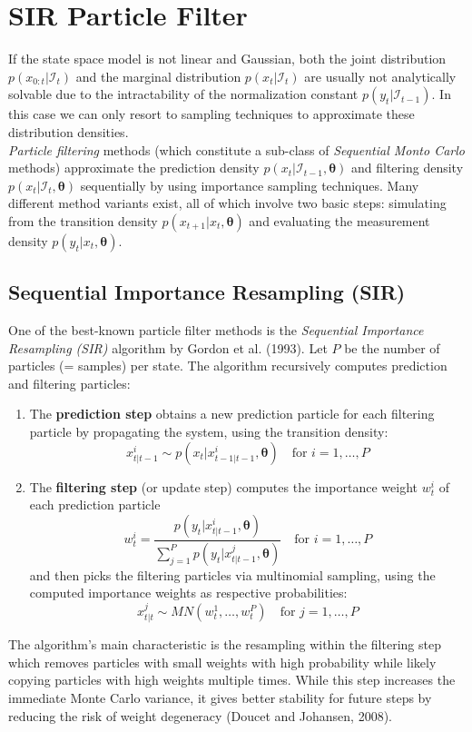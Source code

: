 \documentclass[11pt, oneside]{scrreprt}   	%
\begin{document}
\section{SIR Particle Filter}
If the state space model is not linear and Gaussian, both the joint distribution $p(x_{0:t} | \mathcal{I}_t)$ and the marginal distribution $p(x_{t} | \mathcal{I}_t)$ are usually not analytically solvable due to the intractability of the normalization constant $p(y_t | \mathcal{I}_{t-1})$. In this case we can only resort to sampling techniques to approximate these distribution densities. \\

\textit{Particle filtering} methods (which constitute a sub-class of \textit{Sequential Monto Carlo} methods) approximate the prediction density $p(x_{t} | \mathcal{I}_{t-1}, \boldsymbol{\theta})$ and filtering density $p(x_{t} | \mathcal{I}_{t}, \boldsymbol{\theta})$ sequentially by using importance sampling techniques. Many different method variants exist, all of which involve two basic steps: simulating from the transition density $p(x_{t+1} | x_t, \boldsymbol{\theta})$ and evaluating the measurement density $p(y_t | x_t, \boldsymbol{\theta})$. 

\subsection{Sequential Importance Resampling (SIR)}
One of the best-known particle filter methods is the \textit{Sequential Importance Resampling (SIR)} algorithm by Gordon et al. (1993). Let $P$ be the number of particles (= samples) per state. The algorithm recursively computes prediction and filtering particles:
\begin{enumerate}
	\item The \textbf{prediction step} obtains a new prediction particle for each filtering particle by propagating the system, using the transition density:
	$$
	x_{t | t-1}^i \sim p(x_t | x_{t-1 | t-1}^i, \boldsymbol{\theta}) \quad \text{for } i=1, \ldots, P
	$$
	\item The \textbf{filtering step} (or update step) computes the importance weight $w_t^i$ of each prediction particle 
	$$
	w_{t}^i = \frac{p(y_t | x_{t | t-1}^i, \boldsymbol{\theta})}{\sum_{j=1}^P p(y_t | x_{t | t-1}^j, \boldsymbol{\theta})} \quad \text{for } i=1, \ldots, P
	$$
	and then picks the filtering particles via multinomial sampling, using the computed importance weights as respective probabilities:	
	$$
	x_{t | t }^j \sim MN(w_t^1, \ldots, w_t^P) \quad \text{for } j=1, \ldots, P
	$$
\end{enumerate}
The algorithm's main characteristic is the resampling within the filtering step which removes particles with small weights with high probability while likely copying particles with high weights multiple times. While this step increases the immediate Monte Carlo variance, it gives better stability for future steps by reducing the risk of weight degeneracy (Doucet and Johansen, 2008). 
\end{document}
